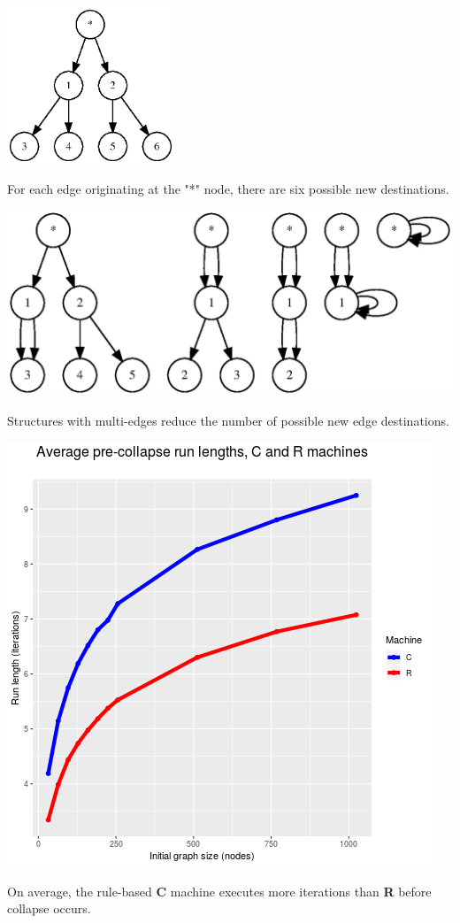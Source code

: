 \documentclass{tufte-handout}
\begin{document}
\begin{marginfigure}
\includegraphics[scale=0.5, width=50mm]{sixchoices.ps}
\caption{For each edge originating at the "*" node, there are six possible new destinations.}
\label{fig:Multiedges}
\end{marginfigure}

\begin{marginfigure}
\vspace{2mm}
\includegraphics{multiedges.ps}
\caption{Structures with multi-edges reduce the number of possible new edge destinations.}
\label{fig:Multiedges}
\end{marginfigure}

\begin{marginfigure}
  \includegraphics{figA.png}
  \caption{On average, the rule-based \textbf{C} machine executes more iterations than \textbf{R} before collapse occurs.}
  \label{fig:figA}
\end{marginfigure}
\end{document}
